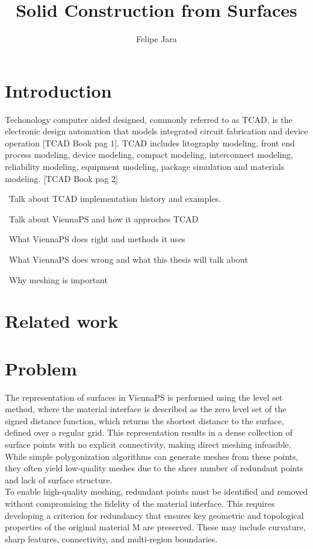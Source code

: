 \documentclass[submission]{eptcs}
\title{Solid Construction from Surfaces}
\author{ Felipe Jara
\institute{Department of Computer Science\\
University of Chile\\
Santiago, Chile}
\email{fjararibet@gmail.com}
}
\begin{document}
\maketitle

\section{Introduction}

Techonology computer aided designed, commonly referred to as TCAD, is the electronic design automation that models integrated circuit fabrication and device operation [TCAD Book pag 1]. TCAD includes litography modeling, front end process modeling, device modeling, compact modeling, interconnect modeling, reliability modeling, equipment modeling, package simulation and materials modeling. [TCAD Book pag 2]

~Talk about TCAD implementation history and examples.

~Talk about ViennaPS and how it approches TCAD

~What ViennaPS does right and methods it uses

~What ViennaPS does wrong and what this thesis will talk about

~Why meshing is important


\section{Related work}


\section{Problem}

The representation of surfaces in ViennaPS is performed using the level set method, where the material interface is described as the zero level set of the signed distance function, which returns the shortest distance to the surface, defined over a regular grid. This representation results in a dense collection of surface points with no explicit connectivity, making direct meshing infeasible. While simple polygonization algorithms can generate meshes from these points, they often yield low-quality meshes due to the sheer number of redundant points and lack of surface structure. \\

To enable high-quality meshing, redundant points must be identified and removed without compromising the fidelity of the material interface. This requires developing a criterion for redundancy that ensures key geometric and topological properties of the original material M are preserved. These may include curvature, sharp features, connectivity, and multi-region boundaries. \\
\end{document}
